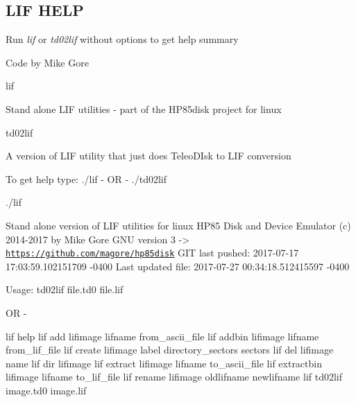 \subsection*{L\+IF H\+E\+LP}

Run {\itshape lif} or {\itshape td02lif} without options to get help summary
\begin{DoxyItemize}
\item Code by Mike Gore
\begin{DoxyItemize}
\item lif
\begin{DoxyItemize}
\item Stand alone L\+IF utilities -\/ part of the H\+P85disk project for linux
\end{DoxyItemize}
\item td02lif
\begin{DoxyItemize}
\item A version of L\+IF utility that just does Teleo\+D\+Isk to L\+IF conversion
\end{DoxyItemize}
\end{DoxyItemize}

To get help type\+: ./lif -\/ OR -\/ ./td02lif
\end{DoxyItemize}


\begin{DoxyPre}
    ./lif\end{DoxyPre}



\begin{DoxyPre}    Stand alone version of LIF utilities for linux
    HP85 Disk and Device Emulator
     (c) 2014-2017 by Mike Gore
     GNU version 3
    -> \href{https://github.com/magore/hp85disk}{\tt https://github.com/magore/hp85disk}
       GIT last pushed:   2017-07-17 17:03:59.102151709 -0400
       Last updated file: 2017-07-27 00:34:18.512415597 -0400\end{DoxyPre}



\begin{DoxyPre}    Usage: td02lif file.td0 file.lif
\begin{DoxyItemize}
\item OR -
\end{DoxyItemize}\end{DoxyPre}



\begin{DoxyPre}    lif help
    lif add lifimage lifname from\_ascii\_file
    lif addbin lifimage lifname from\_lif\_file
    lif create lifimage label directory\_sectors sectors
    lif del lifimage name
    lif dir lifimage
    lif extract lifimage lifname to\_ascii\_file
    lif extractbin lifimage lifname to\_lif\_file
    lif rename lifimage oldlifname newlifname
    lif td02lif image.td0 image.lif
\end{DoxyPre}
 



